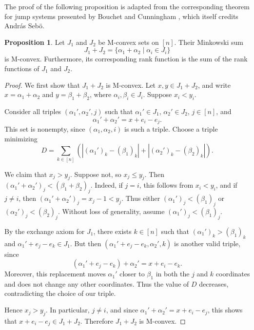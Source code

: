 \documentclass[11pt]{article}
\theoremstyle{definition}
\newtheorem{proposition}[theorem]{Proposition}
\theoremstyle{remark}
\begin{document}
The proof of the following proposition is adapted from the corresponding
theorem for jump systems presented by Bouchet and Cunningham
\cite{bouchetCunninghamDeltaMatroidsJumpSystems}, which itself credits
Andr\'as Seb\"o.

\begin{proposition}\label{prop:sum_polymatroid_is_polymatroid}
    Let $J_1$ and $J_2$ be M-convex sets on $[n]$. Their Minkowski sum
    \[
        J_1+J_2
        =
        \{\alpha_1+\alpha_2\mid\alpha_i\in J_i\}
    \]
    is M-convex. Furthermore, its corresponding rank function is the sum
    of the rank functions of $J_1$ and $J_2$.
\end{proposition}

\begin{proof}
    We first show that $J_1+J_2$ is M-convex. Let $x,y\in J_1+J_2$, and
    write $x=\alpha_1+\alpha_2$ and $y=\beta_1+\beta_2$, where
    $\alpha_i,\beta_i\in J_i$. Suppose $x_i<y_i$.

    Consider all triples $(\alpha_1',\alpha_2',j)$ such that
    $\alpha_1'\in J_1$, $\alpha_2'\in J_2$, $j\in[n]$, and
    \[
        \alpha_1'+\alpha_2'=x+e_i-e_j.
    \]
    This set is nonempty, since $(\alpha_1,\alpha_2,i)$ is such a triple.
    Choose a triple minimizing
    \[
        D
        =
        \sum_{k\in[n]}
        \left(
            |(\alpha_1')_k-(\beta_1)_k|
            +
            |(\alpha_2')_k-(\beta_2)_k|
        \right).
    \]

    We claim that $x_j>y_j$. Suppose not, so $x_j\leq y_j$. Then
    $(\alpha_1'+\alpha_2')_j<(\beta_1+\beta_2)_j$. Indeed, if $j=i$,
    this follows from $x_i<y_i$, and if $j\neq i$, then
    $(\alpha_1'+\alpha_2')_j=x_j-1<y_j$. Thus either
    $(\alpha_1')_j<(\beta_1)_j$ or
    $(\alpha_2')_j<(\beta_2)_j$. Without loss of generality, assume
    $(\alpha_1')_j<(\beta_1)_j$.

    By the exchange axiom for $J_1$, there exists $k\in[n]$ such that
    $(\alpha_1')_k>(\beta_1)_k$ and
    $\alpha_1'+e_j-e_k\in J_1$. But then
    $(\alpha_1'+e_j-e_k,\alpha_2',k)$ is another valid triple, since
    \[
        (\alpha_1'+e_j-e_k)+\alpha_2'=x+e_i-e_k.
    \]
    Moreover, this replacement moves $\alpha_1'$ closer to $\beta_1$ in
    both the $j$ and $k$ coordinates and does not change any other
    coordinates. Thus the value of $D$ decreases, contradicting the choice
    of our triple.

    Hence $x_j>y_j$. In particular, $j\neq i$, and since
    $\alpha_1'+\alpha_2'=x+e_i-e_j$, this shows that
    $x+e_i-e_j\in J_1+J_2$. Therefore $J_1+J_2$ is M-convex.


\end{proof}
\end{document}
